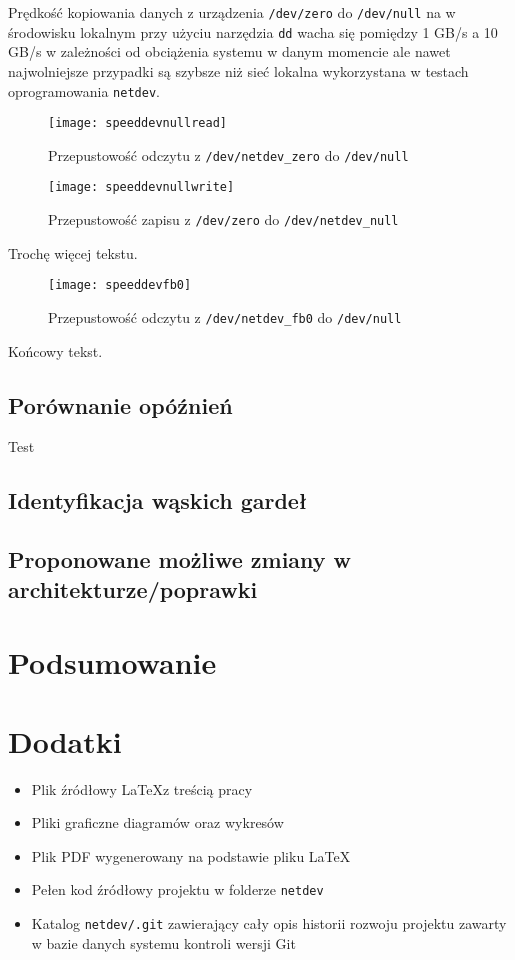 \documentclass[10pt]{article}
\begin{document}
Prędkość kopiowania danych z urządzenia \texttt{/dev/zero} do \texttt{/dev/null} na w środowisku lokalnym przy użyciu narzędzia \texttt{dd} wacha się pomiędzy 1 GB/s a 10 GB/s w zależności od obciążenia systemu w danym momencie ale nawet najwolniejsze przypadki są szybsze niż sieć lokalna wykorzystana w testach oprogramowania \texttt{netdev}.

\begin{figure}[H]
    \caption{Przepustowość odczytu z \texttt{/dev/netdev\_zero} do \texttt{/dev/null}}
    \texttt{[image: speeddevnullread]}
\end{figure}

\begin{figure}[H]
    \caption{Przepustowość zapisu z \texttt{/dev/zero} do \texttt{/dev/netdev\_null}}
    \texttt{[image: speeddevnullwrite]}
\end{figure}

Trochę więcej tekstu.

\begin{figure}[H]
    \caption{Przepustowość odczytu z \texttt{/dev/netdev\_fb0} do \texttt{/dev/null}}
    \texttt{[image: speeddevfb0]}
\end{figure}

Końcowy tekst.

\subsection{Porównanie opóźnień}

Test

\subsection{Identyfikacja wąskich gardeł}

\subsection{Proponowane możliwe zmiany w architekturze/poprawki}

\section{Podsumowanie}
\section{Dodatki}

\begin{itemize}
\itemsep1pt\parskip0pt
\item
  Plik źródłowy \LaTeX z treścią pracy
\item
  Pliki graficzne diagramów oraz wykresów
\item
  Plik PDF wygenerowany na podstawie pliku LaTeX
\item
  Pełen kod źródłowy projektu w folderze \texttt{netdev}
\item
  Katalog \texttt{netdev/.git} zawierający cały opis historii rozwoju projektu
  zawarty w bazie danych systemu kontroli wersji Git
\end{itemize}
\end{document}
